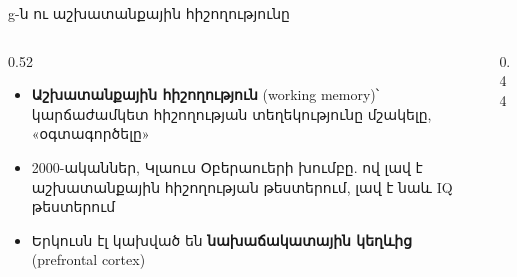 \begin{frame}{g-ն ու աշխատանքային հիշողությունը}
  \begin{columns}[c]
    \begin{column}{0.52\textwidth}
      \begin{itemize}
        \item \textbf{Աշխատանքային հիշողություն} (working memory)՝ կարճաժամկետ հիշողության տեղեկությունը մշակելը, «օգտագործելը»
        \item<2-> 2000-ականներ, Կլաուս Օբերաուերի խումբը. ով լավ է աշխատանքային հիշողության թեստերում, լավ է նաև IQ թեստերում
        \item<3-> Երկուսն էլ կախված են \textbf{նախաճակատային կեղևից} (prefrontal cortex)
      \end{itemize}
    \end{column}
    \begin{column}{0.44\textwidth}
      \centering
    \end{column}
  \end{columns}
\end{frame}

